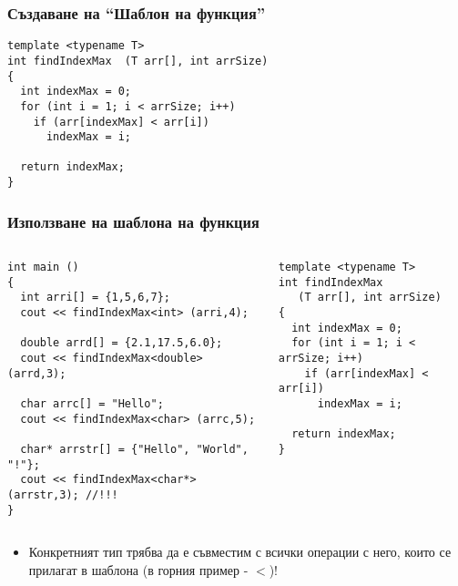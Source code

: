 \documentclass{beamer}
\begin{document}
\begin{frame}[fragile]
\frametitle{Създаване на ``Шаблон на функция''}


\begin{flushleft}
\begin{lstlisting}
template <typename T>
int findIndexMax  (T arr[], int arrSize)
{
  int indexMax = 0;
  for (int i = 1; i < arrSize; i++)
    if (arr[indexMax] < arr[i])
      indexMax = i;

  return indexMax;
}

\end{lstlisting}
\end{flushleft}

\end{frame}


\begin{frame}[fragile]
\frametitle{Използване на шаблона на функция}

\begin{columns}[t]
  \begin{column}{0.6\textwidth}

\begin{flushleft}
\begin{lstlisting}
int main ()
{
  int arri[] = {1,5,6,7};
  cout << findIndexMax<int> (arri,4);

  double arrd[] = {2.1,17.5,6.0};
  cout << findIndexMax<double> (arrd,3);

  char arrc[] = "Hello";
  cout << findIndexMax<char> (arrc,5);

  char* arrstr[] = {"Hello", "World", "!"};
  cout << findIndexMax<char*> (arrstr,3); //!!!
}
\end{lstlisting}
\end{flushleft}

  \end{column}
  \begin{column}{0.4\textwidth}

\begin{flushleft}
\begin{lstlisting}
template <typename T>
int findIndexMax
   (T arr[], int arrSize)
{
  int indexMax = 0;
  for (int i = 1; i < arrSize; i++)
    if (arr[indexMax] < arr[i])
      indexMax = i;

  return indexMax;
}

\end{lstlisting}
\end{flushleft}
  \end{column}
\end{columns}

\begin{itemize}
  \item Конкретният тип трябва да е съвместим с всички операции с него, които се прилагат в шаблона (в горния пример - $<$)!
\end{itemize}

\end{frame}
\end{document}
